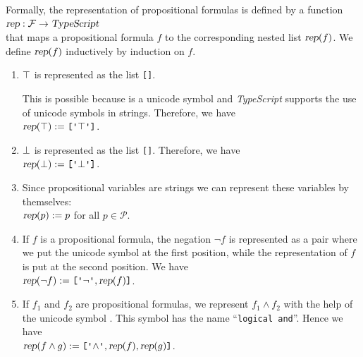 Formally, the representation of propositional formulas is defined by a function 
\\[0.2cm]
\hspace*{1.3cm}
$\textsl{rep}: \mathcal{F} \rightarrow \textsl{TypeScript}$
\\[0.2cm]
that maps a propositional formula $f$ to the corresponding nested list 
$\textsl{rep}(f)$.  We define $\textsl{rep}(f)$ inductively by induction on $f$.
\begin{enumerate}
\item $\top$ is represented as the list \texttt{[\tsq{$\top$}]}.
  
      This is possible because \texttt{\tsq{$\top$}} is a unicode symbol and \textsl{TypeScript} supports the
      use of unicode symbols in strings.  Therefore, we have  
      \\[0.2cm]
      \hspace*{1.3cm}
      $\textsl{rep}(\verum) := \texttt{[\tsq{$\top$}]}$.
\item $\falsum$  is represented as the list \texttt{[\tsq{$\falsum$}]}.      
      Therefore, we have
      \\[0.2cm]
      \hspace*{1.3cm}
      $\textsl{rep}(\falsum) := \texttt{[\tsq{$\falsum$}]}$.
\item Since propositional variables are strings we can represent these variables by themselves:
      \\[0.2cm]
      \hspace*{1.3cm}
      $\textsl{rep}(p) := p$ \quad for all $p \in \mathcal{P}$.
\item If $f$ is a propositional formula, the  negation $\neg f$ is represented as a pair where
      we put the unicode symbol \texttt{\tsq{$\neg$}} at the first position, while the representation of $f$ is put
      at the second position.  We have
      \\[0.2cm]
      \hspace*{1.3cm} 
      $\textsl{rep}(\neg f) := \texttt{[}\texttt{\tsq{$\neg$}}, \textsl{rep}(f)\texttt{]}$.
\item If $f_1$ and $f_2$ are propositional formulas, we represent $f_1 \wedge f_2$ with the help of the
      unicode symbol \texttt{\tsq{$\wedge$}}.  This symbol has the name ``\texttt{logical and}''.  Hence we have
      \\[0.2cm]
      \hspace*{1.3cm} 
      $\textsl{rep}(f \wedge g) := \texttt{[\tsq{$\wedge$}}, \textsl{rep}(f), \textsl{rep}(g)\texttt{]}$.

\end{enumerate}
